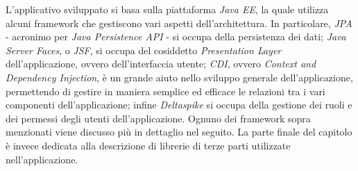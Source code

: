 L'applicativo sviluppato si basa sulla piattaforma \textsl{Java EE}, la quale utilizza alcuni framework che gestiscono vari aspetti dell'architettura. In particolare, \textsl{JPA} - acronimo per \textsl{Java Persistence API} - si occupa della persistenza dei dati; \textsl{Java Server Faces}, o \textsl{JSF}, si occupa del cosiddetto \textsl{Presentation Layer} dell'applicazione, ovvero dell'interfaccia utente; \textsl{CDI}, ovvero \textsl{Context and Dependency Injection}, è un grande aiuto nello sviluppo generale dell'applicazione, permettendo di gestire in maniera semplice ed efficace le relazioni tra i vari componenti dell'applicazione; infine \textsl{Deltaspike} si occupa della gestione dei ruoli e dei permessi degli utenti dell'applicazione.\newline
Ognuno dei framework sopra menzionati viene discusso più in dettaglio nel seguito. La parte finale del capitolo è invece dedicata alla descrizione di librerie di terze parti utilizzate nell'applicazione.